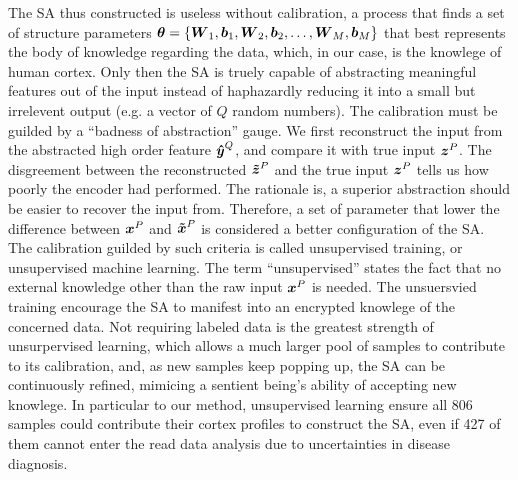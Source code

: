 {The SA thus constructed is useless without calibration, a process that finds a set of structure parameters $\boldsymbol{\theta}=\{\boldsymbol{W}_1, \boldsymbol{b}_1, \boldsymbol{W}_2, \boldsymbol{b}_2, \dots, \boldsymbol{W}_M, \boldsymbol{b}_M\}$ that best represents the body of knowledge regarding the data, which, in our case, is the knowlege of human cortex. Only then the SA is truely capable of abstracting meaningful features out of the input instead of haphazardly reducing it into a small but irrelevent output (e.g. a vector of $Q$ random numbers). The calibration must be guilded by a ``badness of abstraction'' gauge. We first reconstruct the input from the abstracted high order feature $\boldsymbol{\hat{y}}^Q$, and compare it with true input $\boldsymbol{z}^P$. The disgreement between the reconstructed $\boldsymbol{\tilde{z}}^P$ and the true input $\boldsymbol{z}^P$ tells us how poorly the encoder had performed. The rationale is, a superior abstraction should be easier to recover the input from. Therefore, a set of parameter that lower the difference between $\boldsymbol{x}^P$ and $\boldsymbol{\tilde{x}}^P$ is considered a better configuration of the SA. The calibration guilded by such criteria is called unsupervised training, or unsupervised machine learning. The term ``unsupervised'' states the fact that no external knowledge other than the raw input $\boldsymbol{x}^P$ is needed. The unsuersvied training encourage the SA to manifest into an encrypted knowlege of the concerned data. Not requiring labeled data is the greatest strength of unsurpervised learning, which allows a much larger pool of samples to contribute to its calibration, and, as new samples keep popping up, the SA can be continuously refined, mimicing a sentient being's ability of accepting new knowlege. In particular to our method, unsupervised learning ensure all 806 samples could contribute their cortex profiles to construct the SA, even if 427 of them cannot enter the read data analysis due to uncertainties in disease diagnosis.

}
